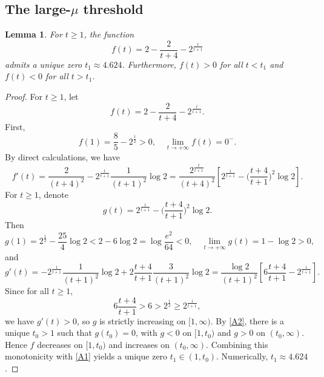 \documentclass[10pt,a4paper]{amsart}
\newtheorem{lemma}{Lemma}[section]
\begin{document}
\subsection{\texorpdfstring{{The large-$\mu$ threshold}}{The large-mu threshold}}
\begin{lemma}\label{num}
For $t\geq1$, the function
\begin{equation*}
f(t)=2-\frac{2}{t+4}-2^{\frac{t}{t+1}}
\end{equation*}
admits a unique zero $t_1\approx {4.624}$. Furthermore, $f(t)>0$ for all $t<t_1$ and $f(t)<0$ for all $t>t_1$.
\end{lemma}
\begin{proof}
For $t\geq1$, let
\begin{equation*}
f(t)=2-\frac{2}{t+4}-2^{\frac{t}{t+1}}.
\end{equation*}
 {First,}
\begin{equation}\label{A1}
 f(1)=\frac{8}{5}-2^{\frac{1}{2}}>0,\quad
 \lim\limits_{t\rightarrow+\infty}f(t)=0^-.
\end{equation}
By direct calculations, we have
\begin{equation*}
 f'(t)=\frac{2}{(t+4)^2}-2^{\frac{t}{t+1}}\frac{1}{(t+1)^2}\log 2=\frac{2^{\frac{t}{t+1}}}{(t+4)^2}\left[2^{\frac{1}{t+1}}-\bigg(\frac{t+4}{t+1}\bigg)^2\log 2\right].
\end{equation*}
For $t\geq1$, denote
\begin{equation*}
g(t)=2^{\frac{1}{t+1}}-\bigg(\frac{t+4}{t+1}\bigg)^2\log 2.
\end{equation*}
 Then
\begin{equation}\label{A2}
 g(1)=2^{\frac{1}{2}}-\frac{25}{4}\log 2<2-6\log 2=\log \frac{e^2}{64}<0,\quad \lim\limits_{t\rightarrow+\infty}g(t)=1-\log2>0,
\end{equation}
and
\begin{equation*}
 g'(t)=-2^{\frac{1}{t+1}}\frac{1}{(t+1)^2}\log 2+2\frac{t+4}{t+1}\frac{3}{(t+1)^2}\log 2=\frac{\log 2}{(t+1)^2}\left[6\frac{t+4}{t+1}-2^{\frac{1}{t+1}}\right].
\end{equation*}
Since for all $t\geq1$,
\begin{equation*}
 6\frac{t+4}{t+1}>6>2^{\frac{1}{2}}\geq2^{\frac{1}{t+1}},
\end{equation*}
{we have $g'(t)>0$, so $g$ is strictly increasing on $[1,\infty)$. By \eqref{A2}, there is a unique $t_0>1$ such that $g(t_0)=0$, with $g<0$ on $[1,t_0)$ and $g>0$ on $(t_0,\infty)$. Hence $f$ decreases on $[1,t_0)$ and increases on $(t_0,\infty)$. Combining this monotonicity with \eqref{A1} yields a unique zero $t_1\in(1,t_0)$. Numerically, $t_1\approx{4.624}$.}
\end{proof}
\end{document}
